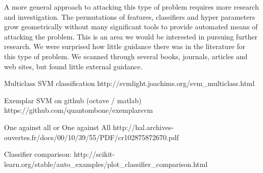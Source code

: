 \documentclass[11pt, oneside]{article}   	%
\begin{document}
A more general approach to attacking this type of problem requires more research and investigation. The permutations of features, classifiers and hyper parameters grow geometrically without many significant tools to provide automated means of attacking the problem. This is an area we would be interested in pursuing further research.
\clearpage
We were surprised how little guidance there was in the literature for this type of problem. We scanned through several books, journals, articles and web sites, but found little external guidance.


\renewcommand{\refname}{Background Reading}

\begin{thebibliography}{1}

  Multiclass SVM classification http://svmlight.joachims.org/svm\_multiclass.html

  Exemplar SVM on github (octave / matlab)
  https://github.com/quantombone/exemplarsvm

  One against all or One against All
  http://hal.archives-ouvertes.fr/docs/00/10/39/55/PDF/cr102875872670.pdf

  Classifier comparison:
  http://scikit-learn.org/stable/auto\_examples/plot\_classifier\_comparison.html

  \end{thebibliography}
\end{document}
